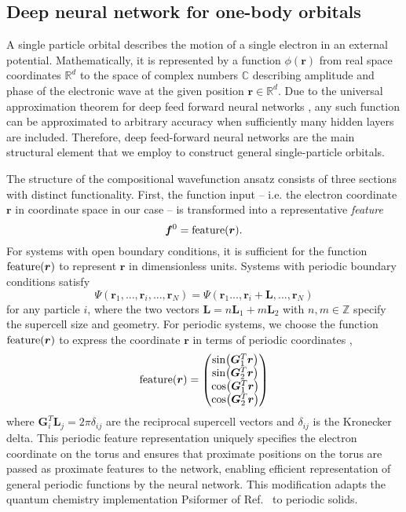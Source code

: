 \documentclass[
 reprint,
 amsmath,amssymb,
 aps, prx,
floatfix,longbibliography,
]{revtex4-2}
\begin{document}
\subsection{Deep neural network for one-body orbitals}
\label{sec:NN-onebody}

A single particle orbital describes the motion of a single electron in an external potential. Mathematically, it is represented by a function $\phi(\bm r)$ from real space coordinates $\mathbb{R}^d$ to the space of complex numbers $\mathbb{C}$ describing amplitude and phase of the electronic wave at the given position $\bm r \in \mathbb{R}^d$. Due to the universal approximation theorem for deep feed forward neural networks \cite{Hornik1989Jan}, any such function can be approximated to arbitrary accuracy when sufficiently many hidden layers are included. Therefore, deep feed-forward neural networks are the main structural element that we employ to construct general single-particle orbitals.

The structure of the compositional wavefunction ansatz consists of three sections with distinct functionality. 
First, the function input -- i.e. the electron coordinate $\bm r$ in coordinate space in our case -- is transformed into a representative \emph{feature} 
\begin{equation}
    \bm f^0 = {\rm feature}(\bm r). 
    \label{eq:NN-orbital-feature}
\end{equation}
For systems with open boundary conditions, it is sufficient for the function ${\rm feature}(\bm r)$ to represent $\bm r$ in dimensionless units. 
Systems with periodic boundary conditions satisfy
\begin{equation}
    \Psi(\bm r_1, ..., \bm r_i, ..., \bm r_N) = \Psi( \bm r_1 ..., \bm r_i + \bm L, ..., \bm r_N)
\end{equation}
for any particle $i$, where the two vectors $\bm L = n \bm L_1 + m \bm L_2$ with $n,m \in \mathbb{Z}$ specify the supercell size and geometry.
For periodic systems, we choose the function ${\rm feature}(\bm r)$ to express the coordinate $\bm r$ in terms of periodic coordinates \cite{pescia2022neural,Cassella2023Jan},
\begin{equation}
    {\rm feature}(\bm r) = \begin{pmatrix}
        \sin(\bm G_1^T\bm r) \\
        \sin(\bm G_2^T \bm r) \\
        \cos (\bm G_1^T \bm r)\\
        \cos (\bm G_2^T \bm r)
    \end{pmatrix}
\end{equation}
where $\bm G_i^T \bm L_j = 2\pi \delta_{ij}$ are the reciprocal supercell vectors and $\delta_{ij}$ is the Kronecker delta. 
This periodic feature representation uniquely specifies the electron coordinate on the torus and ensures that proximate positions on the torus are passed as proximate features to the network, enabling efficient representation of general periodic functions by the neural network. This modification adapts the quantum chemistry implementation Psiformer of Ref.~\cite{vonGlehn2022Nov} to periodic solids. 
\end{document}

